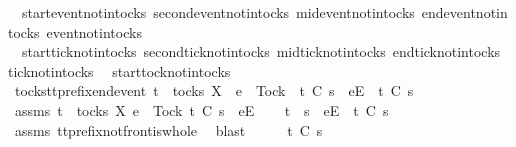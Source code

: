 \begin{isabellebody}
\ \ start{\isacharunderscore}event{\isacharunderscore}notin{\isacharunderscore}tocks\ second{\isacharunderscore}event{\isacharunderscore}notin{\isacharunderscore}tocks\ mid{\isacharunderscore}event{\isacharunderscore}notin{\isacharunderscore}tocks\ end{\isacharunderscore}event{\isacharunderscore}notin{\isacharunderscore}tocks\ event{\isacharunderscore}notin{\isacharunderscore}tocks\isanewline
\ \ start{\isacharunderscore}tick{\isacharunderscore}notin{\isacharunderscore}tocks\ second{\isacharunderscore}tick{\isacharunderscore}notin{\isacharunderscore}tocks\ mid{\isacharunderscore}tick{\isacharunderscore}notin{\isacharunderscore}tocks\ end{\isacharunderscore}tick{\isacharunderscore}notin{\isacharunderscore}tocks\ tick{\isacharunderscore}notin{\isacharunderscore}tocks\isanewline
\ \ start{\isacharunderscore}tock{\isacharunderscore}notin{\isacharunderscore}tocks\isanewline
\isanewline
{}\isamarkupfalse%
\ tocks{\isacharunderscore}tt{\isacharunderscore}prefix{\isacharunderscore}end{\isacharunderscore}event{\isacharcolon}\ {\isachardoublequoteopen}t\ {\isasymin}\ tocks\ X\ {\isasymLongrightarrow}\ e\ {\isasymnoteq}\ Tock\ {\isasymLongrightarrow}\ t\ {\isasymle}\isactrlsub C\ s\ {\isacharat}\ {\isacharbrackleft}{\isacharbrackleft}e{\isacharbrackright}\isactrlsub E{\isacharbrackright}\ {\isasymLongrightarrow}\ t\ {\isasymle}\isactrlsub C\ s{\isachardoublequoteclose}\isanewline
%
\isadelimproof
%
\endisadelimproof
%
\isatagproof
{}\isamarkupfalse%
\ {\isacharminus}\isanewline
\ \ \isamarkupfalse%
\ assms{\isacharcolon}\ {\isachardoublequoteopen}t\ {\isasymin}\ tocks\ X{\isachardoublequoteclose}\ {\isachardoublequoteopen}e\ {\isasymnoteq}\ Tock{\isachardoublequoteclose}\ {\isachardoublequoteopen}t\ {\isasymle}\isactrlsub C\ s\ {\isacharat}\ {\isacharbrackleft}{\isacharbrackleft}e{\isacharbrackright}\isactrlsub E{\isacharbrackright}{\isachardoublequoteclose}\isanewline
\ \ \isamarkupfalse%
\ {\isachardoublequoteopen}t\ {\isacharequal}\ s\ {\isacharat}\ {\isacharbrackleft}{\isacharbrackleft}e{\isacharbrackright}\isactrlsub E{\isacharbrackright}\ {\isasymor}\ t\ {\isasymle}\isactrlsub C\ s{\isachardoublequoteclose}\isanewline
\ \ \ \ \isamarkupfalse%
\ assms{\isacharparenleft}{}{\isacharparenright}\ tt{\isacharunderscore}prefix{\isacharunderscore}notfront{\isacharunderscore}is{\isacharunderscore}whole\ \isamarkupfalse%
\ blast\isanewline
\ \ \isamarkupfalse%
\ \isamarkupfalse%
\ {\isachardoublequoteopen}t\ {\isasymle}\isactrlsub C\ s{\isachardoublequoteclose}\isanewline

\end{isabellebody}
